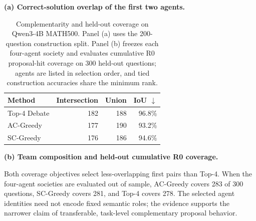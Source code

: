 \begin{table}[H]
\centering
\caption{Complementarity and held-out coverage on Qwen3-4B MATH500. Panel (a)
uses the 200-question construction split. Panel (b) freezes each four-agent
society and evaluates cumulative R0 proposal-hit coverage on 300 held-out
questions; agents are listed in selection order, and tied construction
accuracies share the minimum rank.}
\label{tab:complementary_coverage}
\vspace{0.3em}
\textbf{(a) Correct-solution overlap of the first two agents.}\\[0.2em]
\small
\begin{tabular}{lrrr}
\toprule
Method & Intersection & Union & IoU $\downarrow$ \\
\midrule
Top-4 Debate & 182 & 188 & 96.8\% \\
AC-Greedy & 177 & 190 & 93.2\% \\
SC-Greedy & 176 & 186 & 94.6\% \\
\bottomrule
\end{tabular}

\vspace{0.7em}
\textbf{(b) Team composition and held-out cumulative R0 coverage.}\\[0.2em]
\scriptsize
{}
\end{table}

Both coverage objectives select less-overlapping first pairs than Top-4. When
the four-agent societies are evaluated out of sample, AC-Greedy covers 283 of
300 questions, SC-Greedy covers 281, and Top-4 covers 278. The selected agent
identities need not encode fixed semantic roles; the evidence supports the
narrower claim of transferable, task-level complementary proposal behavior.

